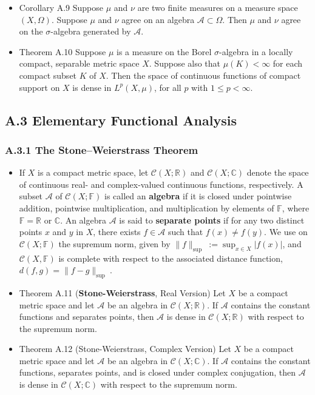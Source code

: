 \begin{itemize}
\item Corollary A.9 Suppose $\mu$ and $\nu$ are two finite measures on a measure space $(X, \Omega)$. Suppose $\mu$ and $\nu$ agree on an algebra $\mathcal{A} \subset \Omega$. Then $\mu$ and $\nu$ agree on the $\sigma$-algebra generated by $\mathcal{A}$.

\item Theorem A.10 Suppose $\mu$ is a measure on the Borel $\sigma$-algebra in a locally compact, separable metric space $X$. Suppose also that $\mu(K)<\infty$ for each compact subset $K$ of $X$. Then the space of continuous functions of compact support on $X$ is dense in $L^{p}(X, \mu)$, for all $p$ with $1 \leq p<\infty$.
\end{itemize}

\subsection{A.3 Elementary Functional Analysis}

\subsubsection{A.3.1 The Stone–Weierstrass Theorem}
\begin{itemize}
\item If $X$ is a compact metric space, let $\mathcal{C}(X ; \mathbb{R})$ and $\mathcal{C}(X ; \mathbb{C})$ denote the space of continuous real- and complex-valued continuous functions, respectively. A subset $\mathcal{A}$ of $\mathcal{C}(X ; \mathbb{F})$ is called an \textbf{algebra} if it is closed under pointwise addition, pointwise multiplication, and multiplication by elements of $\mathbb{F}$, where $\mathbb{F}=\mathbb{R}$ or $\mathbb{C}$. An algebra $\mathcal{A}$ is said to \textbf{separate points} if for any two distinct points $x$ and $y$ in $X$, there exists $f \in \mathcal{A}$ such that $f(x) \neq f(y)$. We use on $\mathcal{C}(X ; \mathbb{F})$ the supremum norm, given by $\|f\|_{\text {sup }}:=\sup _{x \in X}|f(x)|$, and $\mathcal{C}(X, \mathbb{F})$ is complete with respect to the associated distance function, $d(f, g)=\|f-g\|_{\text {sup }}$.

\item Theorem A.11 (\textbf{Stone-Weierstrass}, Real Version) Let $X$ be a compact metric space and let $\mathcal{A}$ be an algebra in $\mathcal{C}(X ; \mathbb{R})$. If $\mathcal{A}$ contains the constant functions and separates points, then $\mathcal{A}$ is dense in $\mathcal{C}(X ; \mathbb{R})$ with respect to the supremum norm.

\item Theorem A.12 (Stone-Weierstrass, Complex Version) Let $X$ be a compact metric space and let $\mathcal{A}$ be an algebra in $\mathcal{C}(X ; \mathbb{C})$. If $\mathcal{A}$ contains the constant functions, separates points, and is closed under complex conjugation, then $\mathcal{A}$ is dense in $\mathcal{C}(X ; \mathbb{C})$ with respect to the supremum norm.
\end{itemize}

